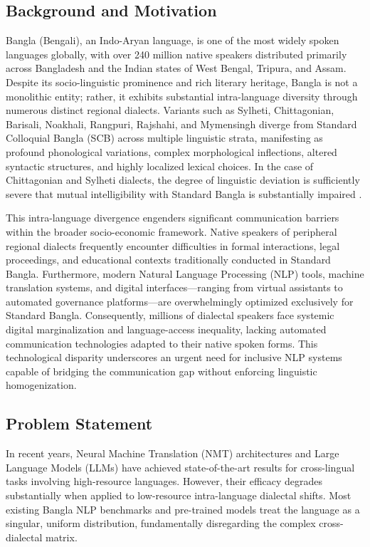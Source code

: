\documentclass[12pt,a4paper]{article}
\begin{document}
\subsection{Background and Motivation}
Bangla (Bengali), an Indo-Aryan language, is one of the most widely spoken languages globally, with over 240 million native speakers distributed primarily across Bangladesh and the Indian states of West Bengal, Tripura, and Assam. Despite its socio-linguistic prominence and rich literary heritage, Bangla is not a monolithic entity; rather, it exhibits substantial intra-language diversity through numerous distinct regional dialects. Variants such as Sylheti, Chittagonian, Barisali, Noakhali, Rangpuri, Rajshahi, and Mymensingh diverge from Standard Colloquial Bangla (SCB) across multiple linguistic strata, manifesting as profound phonological variations, complex morphological inflections, altered syntactic structures, and highly localized lexical choices. In the case of Chittagonian and Sylheti dialects, the degree of linguistic deviation is sufficiently severe that mutual intelligibility with Standard Bangla is substantially impaired \cite{faria2025vashantor}.

This intra-language divergence engenders significant communication barriers within the broader socio-economic framework. Native speakers of peripheral regional dialects frequently encounter difficulties in formal interactions, legal proceedings, and educational contexts traditionally conducted in Standard Bangla. Furthermore, modern Natural Language Processing (NLP) tools, machine translation systems, and digital interfaces---ranging from virtual assistants to automated governance platforms---are overwhelmingly optimized exclusively for Standard Bangla. Consequently, millions of dialectal speakers face systemic digital marginalization and language-access inequality, lacking automated communication technologies adapted to their native spoken forms. This technological disparity underscores an urgent need for inclusive NLP systems capable of bridging the communication gap without enforcing linguistic homogenization.

\subsection{Problem Statement}
In recent years, Neural Machine Translation (NMT) architectures and Large Language Models (LLMs) have achieved state-of-the-art results for cross-lingual tasks involving high-resource languages. However, their efficacy degrades substantially when applied to low-resource intra-language dialectal shifts. Most existing Bangla NLP benchmarks and pre-trained models treat the language as a singular, uniform distribution, fundamentally disregarding the complex cross-dialectal matrix.
\end{document}
